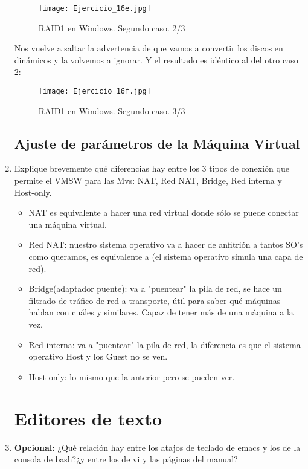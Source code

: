 \documentclass[paper=a4, fontsize=11pt]{scrartcl} %
\numberwithin{equation}{section} %
\numberwithin{figure}{section} %
\numberwithin{table}{section} %
\begin{document}
\begin{enumerate}
		\begin{figure}[ht!]
			\centering
			\texttt{[image: Ejercicio\_16e.jpg]}
			\caption{RAID1 en Windows. Segundo caso. 2/3} 	
			\label{fig:RAID1 2-2/3}
		\end{figure}

		Nos vuelve a saltar la advertencia de que vamos a convertir los discos en dinámicos y la 
		volvemos a ignorar. Y el resultado es idéntico al del otro caso \ref{fig:RAID1 2-3/3}:
		
		\begin{figure}[ht!]
			\centering
			\texttt{[image: Ejercicio\_16f.jpg]}
			\caption{RAID1 en Windows. Segundo caso. 3/3} 	
			\label{fig:RAID1 2-3/3}
		\end{figure}
		
		
	\subsection{Ajuste de parámetros de la Máquina Virtual}
		\item Explique brevemente qué diferencias hay entre los 3 tipos de conexión que permite el
		VMSW para las Mvs: NAT, Red NAT, Bridge, Red interna y Host-only.
		\begin{itemize}
			\item NAT es equivalente a hacer una red virtual donde sólo se puede conectar una máquina
			virtual.
			\item Red NAT: nuestro sistema operativo va a hacer de anfitrión a tantos SO's como
			queramos, es equivalente a (el sistema operativo simula una capa de red).
			\item Bridge(adaptador puente): va a "puentear" la pila de red, se hace un filtrado de
			tráfico de red a transporte, útil para saber qué máquinas hablan con cuáles y similares.
			Capaz de tener más de una máquina a la vez.
			\item Red interna: va a "puentear" la pila de red, la diferencia es que el sistema operativo
			Host y los Guest no se ven.
			\item Host-only: lo mismo que la anterior pero se pueden ver.
		\end{itemize}
		
	\section{Editores de texto}
		\item \textbf{Opcional:} ¿Qué relación hay entre los atajos de teclado de emacs y los de
		la consola de bash?¿y entre los de vi y las páginas del manual?
		

\end{enumerate}
\end{document}

